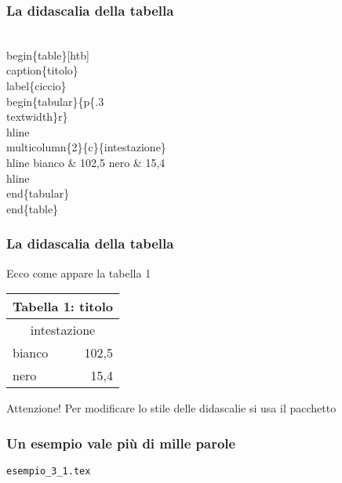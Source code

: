 \begin{frame}
  \frametitle{La didascalia della tabella}
	\begin{LaTeXcode}
		\\begin\{table\}[htb]\alert{\\caption\{titolo\}\\label\{ciccio\}}\n
		\\begin\{tabular\}\{p\{.3\\textwidth\}r\}\
		\\hline \n
		\\multicolumn\{2\}\{c\}\{intestazione\}\bs\bs \
		\\hline \n
		\hspace*{5ex}bianco \& 102,5 \bs\bs\n
		\hspace*{5ex}nero   \& 15,4 \bs\bs\
		\\hline\n
		\\end\{tabular\}\n
		\\end\{table\}
	\end{LaTeXcode}
\end{frame}
\begin{frame}
  \frametitle{La didascalia della tabella}
	Ecco come appare la tabella 1
	\begin{LaTeXoutput}
	  \begin{center}
		\begin{table}
		\begin{tabular}{p{}r}
		\multicolumn{2}{c}{Tabella 1: titolo}\\[1ex]\hline %
		\multicolumn{2}{c}{intestazione}\\\hline
		bianco & 102,5 \\
		nero   & 15,4 \\\hline
		\end{tabular}
		\end{table}
	  \end{center}
	\end{LaTeXoutput}
  \bigskip
	\begin{block}{Attenzione!}
		Per modificare lo stile delle didascalie si usa il pacchetto 
	\end{block}
\end{frame}
\begin{frame}
  \frametitle{Un esempio vale pi\`u di mille parole}
	\begin{center}
		\alert{\texttt{esempio\_3\_1.tex}}
	\end{center}
\end{frame}
